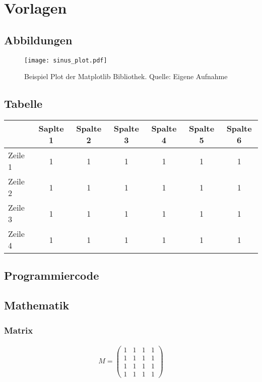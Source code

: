 \chapter{Vorlagen}



\section{Abbildungen}
\begin{figure}[h]
	\centering
	\texttt{[image: sinus\_plot.pdf]}
	\caption[Beispiel Plot der Matplotlib Bibliothek]{Beispiel Plot der Matplotlib Bibliothek. Quelle: Eigene Aufnahme}
	\label{fig:sinus_plot}
\end{figure}


\section{Tabelle}
\begin{table}[H]
	\centering
	\begin{tabular}{l|c|c|c|c|c|c}
		&	Saplte 1	&	Spalte 2	&	Spalte 3	&	Spalte 4	&	Spalte 5	&	Spalte 6\\
		\hline
		Zeile 1		&	1	&	1	&	1 	&	1 &	1	&	1\\
		\hline
		Zeile 2	&	1	&	1	&	1	&	1	&	1		&	1\\
		\hline
		Zeile 3	&  1	&	1	&	1	&	1	&	1	&	1\\
		\hline
		Zeile 4	&	1	&	1	&	1	&	1	&	1	&	1
	\end{tabular}
\end{table}

\section{Programmiercode}


\section{Mathematik}
\subsection{Matrix}
\begin{align}
	M =
	\begin{pmatrix}
		1 &	1	& 1 & 1\\
		1 & 1 & 1 & 1\\
		1 & 1 & 1 & 1\\
		1 & 1 & 1 & 1
	\end{pmatrix}
\end{align}


